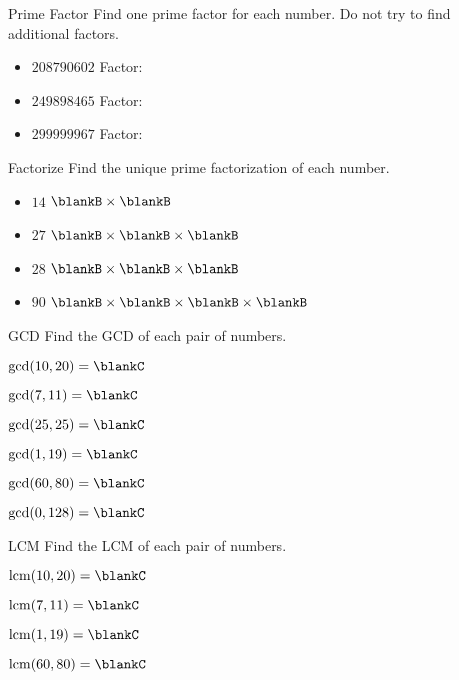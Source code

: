 \documentclass[12pt,letterpaper]{article}
\begin{document}
\begin{problem}{Prime Factor}
 Find one prime factor for each number. Do not try to find additional factors.

 \begin{itemize}
  \item $208790602$ \hfill Factor: \blankB
  \item $249898465$ \hfill Factor: \blankB
  \item $299999967$ \hfill Factor: \blankB
 \end{itemize}

\end{problem}

\begin{problem}{Factorize}
 Find the unique prime factorization of each number.

 \begin{itemize}
  \item $14$ \hfill $\blankB \times \blankB$
  \item $27$ \hfill $\blankB \times \blankB \times \blankB$
  \item $28$ \hfill $\blankB \times \blankB \times \blankB$
  \item $90$ \hfill $\blankB \times \blankB \times \blankB \times \blankB$
 \end{itemize}
\end{problem}

\begin{problem}{GCD}
 Find the GCD of each pair of numbers.

 \begin{itemize}
  \begin{multicols}{2}
   \item $\gcd(10, 20) = \blankC$
   \item $\gcd(7, 11) = \blankC$
   \item $\gcd(25, 25) = \blankC$
   \item $\gcd(1, 19) = \blankC$
   \item $\gcd(60, 80) = \blankC$
   \item $\gcd(0, 128) = \blankC$
  \end{multicols}
 \end{itemize}
\end{problem}

\begin{problem}{LCM}
 Find the LCM of each pair of numbers.

 \begin{itemize}
  \begin{multicols}{2}
   \item $\operatorname{lcm}(10, 20) = \blankC$
   \item $\operatorname{lcm}(7, 11) = \blankC$
   \item $\operatorname{lcm}(1, 19) = \blankC$
   \item $\operatorname{lcm}(60, 80) = \blankC$
  \end{multicols}
 \end{itemize}
\end{problem}
\end{document}
